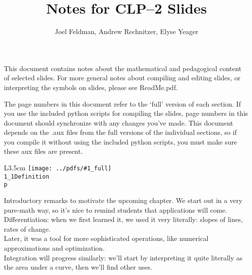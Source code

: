 \documentclass{beamer}
\title{Notes for CLP--2 Slides}
\date{}
\author{Joel Feldman, Andrew Rechnitzer, Elyse Yeager}
\newcommand{\notefig}[3]{%
	\begin{wrapfigure}{L}{3.5cm}
	\texttt{[image: ../pdfs/\#1\_full]}\\
	\footnotesize
	\texttt{#2}\\
	 \texttt{p \pageref{#3}}
	\end{wrapfigure}
	}
\begin{document}
\begin{frame}

\maketitle
This document contains notes about the mathematical and pedagogical content of selected slides. For more general notes about compiling and editing slides, or interpreting the symbols on slides, please see ReadMe.pdf.

\end{frame}
%
\begin{frame}
The page numbers in this document refer to the `full' version of each section.
\vfill
If you use the included python scripts for compiling the slides, page numbers in this document should synchronize with any changes you've made. This document depends on the .aux files from the full versions of the individual sections, so if you compile it without using the included python scripts, you must make sure these aux files are present.
\end{frame}
%

\begin{frame}
\notefig{1_1Definition}{1\_1Definition}{note1.1a}
Introductory remarks to motivate the upcoming chapter. We start out in a very pure-math way, so it's nice to remind students that applications will come.\\[1em]
  Differentiation: when we first learned it, we used it very literally: slopes of lines, rates of change.\\
  Later, it was a tool for more sophisticated operations, like numerical approximations and optimization.\\[1em]
  Integration will progress similarly: we'll start by interpreting it quite literally as the area under a curve, then we'll find other uses.
\end{frame}
\end{document}
